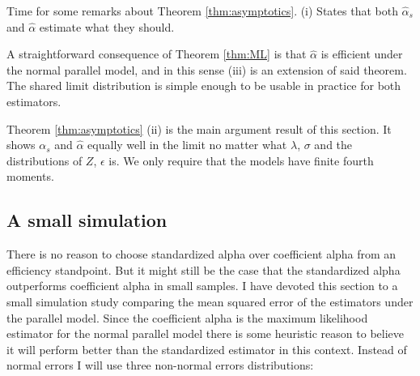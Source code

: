 \documentclass{article}
\theoremstyle{plain}
\theoremstyle{plain}
\theoremstyle{definition}
\theoremstyle{remark}
\theoremstyle{definition}
\theoremstyle{plain}
\theoremstyle{plain}
\theoremstyle{definition}
\begin{document}
Time for some remarks about Theorem \ref{thm:asymptotics}. (i) States that both $\widehat{\alpha}_s$ and $\widehat{\alpha}$ estimate what they should. 

A straightforward consequence of Theorem \ref{thm:ML} is that $\widehat{\alpha}$ is efficient under the normal parallel model, and in this sense (iii) is an extension of said theorem. The shared limit distribution is simple enough to be usable in practice for both estimators. 

Theorem \ref{thm:asymptotics} (ii) is the main argument result of this section. It shows $\alpha_{s}$ and $\widehat{\alpha}$ equally well in the limit no matter what $\lambda$, $\sigma$ and the distributions of $Z$, $\epsilon$ is. We only require that the models have finite fourth moments.

\subsection{A small simulation}
There is no reason to choose standardized alpha over coefficient alpha from an efficiency standpoint. But it might still be the case
that the standardized alpha outperforms coefficient alpha
in small samples. I have devoted this section to a small simulation
study comparing the mean squared error of the estimators under
the parallel model. Since the coefficient alpha is the maximum likelihood
estimator for the normal parallel model there is some heuristic reason
to believe it will perform better than the standardized estimator
in this context. Instead of normal errors I will use three non-normal
errors distributions:
\end{document}
